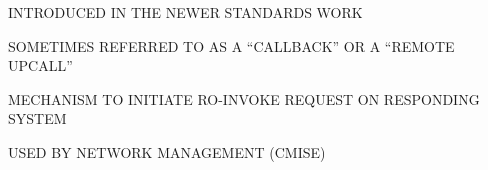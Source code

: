 %
%
%


%
%
%
%
%
%
%
%


%
%
%


\begin{bwslide}

\begin{nrtc}
\item	INTRODUCED IN THE NEWER STANDARDS WORK
\item	SOMETIMES REFERRED TO AS A ``CALLBACK'' OR A
	``REMOTE UPCALL''
\item	MECHANISM TO INITIATE RO-INVOKE REQUEST ON RESPONDING SYSTEM
\item	USED BY NETWORK MANAGEMENT (CMISE)
\end{nrtc}
\end{bwslide}


